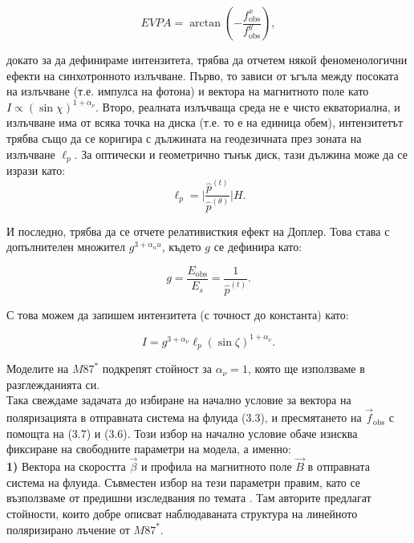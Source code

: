 \documentclass[12pt]{article}
\numberwithin{equation}{section}
\numberwithin{figure}{section}
\begin{document}
	\begin{equation}
		EVPA = \arctan\left(-\frac{f^x_\text{obs}}{f^y_\text{obs}}\right),
	\end{equation}
	
	\noindent докато за да дефинираме интензитета, трябва да отчетем някой феноменологични ефекти на синхотронното излъчване. Първо, то зависи от ъгъла между посоката на излъчване (т.е. импулса на фотона) и вектора на магнитното поле като $I\propto \left(\sin\chi\right)^{1+\alpha_\nu}$. Второ, реалната излъчваща среда не е чисто екваториална, и излъчване има от всяка точка на диска (т.е. то е на единица обем), интензитетът трябва също да се коригира с дължината на геодезичната през зоната на излъчване $\ell_p$. За оптически и геометрично тънък диск, тази дължина може да се изрази като:
	\begin{equation}
		\ell_p = \bigg\vert\frac{\hat{p}^{(t)}}{\hat{p}^{(\theta)}}\bigg\vert H.
	\end{equation}
	
	\noindent И последно, трябва да се отчете релативисткия ефект на Доплер. Това става с допълнителен множител $g^{3 + \alpha_nu}$, където $g$ се дефинира като:
	
	\begin{equation}
			g = \frac{E_\text{obs}}{E_s} = \frac{1}{\hat{p}^{(t)}}.
	\end{equation}
	
	\noindent С това можем да запишем интензитета (с точност до константа) като:
	
	\begin{equation}
		I = g^{3 + \alpha_\nu}\ell_p(\sin\zeta)^{1 + \alpha_\nu}.
	\end{equation}
	
	\noindent Моделите на $M87^*$ подкрепят стойност за $\alpha_\nu = 1$, която ще използваме в разглежданията си.\\
	
	Така свеждаме задачата до избиране на начално условие за вектора на поляризацията в отправната система на флуида (3.3), и пресмятането на $\vec{f}_\text{obs}$ с помощта на (3.7) и (3.6). Този избор на начално условие обаче изисква фиксиране на свободните параметри на модела, а именно:\\
	
	\textbf{1)} Вектора на скоростта $\vec{\beta}$ и профила на магнитното поле $\vec{B}$ в отправната система на флуида. Съвместен избор на тези параметри правим, като се възползваме от предишни изследвания по темата \cite{Narayan2021}. Там авторите предлагат стойности, които добре описват наблюдаваната структура на линейното поляризирано лъчение от $M87^*$.\\
	
\end{document}
